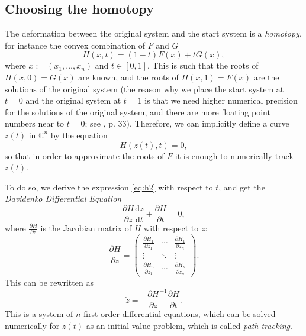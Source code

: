 \documentclass[a4paper]{article}
\newcommand{\C}{\mathbb{C}}
\theoremstyle{definition}
\theoremstyle{definition}
\theoremstyle{remark}
\theoremstyle{definition}
\begin{document}
\subsection{Choosing the homotopy}
The deformation between the original system and the start system is a \textit{homotopy}, for instance the convex combination of $F$ and $G$
\begin{equation}\label{eq:h1} H(x,t)=(1-t)F(x)+tG(x) ,\end{equation}
where $x:=(x_1,\ldots,x_n)$ and $t\in[0,1].$ This is such that the roots of $H(x,0)=G(x)$ are known, and the roots of $H(x,1)=F(x)$ are the solutions of the original system (the
reason why we place the start system at $t=0$ and the original system at $t=1$ is that we need higher numerical precision for the solutions of the original system, and there are more
floating point numbers near to $t=0$; see \cite{BertiniBook}, p. 33).
Therefore, we can implicitly
define a curve $z(t)$ in $\C^n$ by the equation \begin{equation}\label{eq:h2} H(z(t),t)=0,\end{equation} so that in order to approximate the roots of $F$ it is enough to numerically track $z(t)$.

To do so, we derive the expression \eqref{eq:h2} with respect to $t$, and get the \textit{Davidenko Differential Equation}
$$ \frac{\partial H}{\partial z}\frac{\mathrm{d} z}{\mathrm{d} t}+\frac{\partial H}{\partial t}=0 ,$$
where $\frac{\partial H}{\partial z}$ is the Jacobian matrix of $H$ with respect to $z$:
$$
    \frac{\partial H}{\partial z}=
    \begin{pmatrix}
        \frac{\partial H_1}{\partial z_1} & \cdots & \frac{\partial H_1}{\partial z_n} \\
        \vdots                            & \ddots & \vdots                            \\
        \frac{\partial H_n}{\partial z_1} & \cdots & \frac{\partial H_n}{\partial z_n}
    \end{pmatrix} .
$$
This can be rewritten as
\begin{equation}\label{eq:dav} \dot{z}=-\frac{\partial H}{\partial z}^{-1}\frac{\partial H}{\partial t} .\end{equation}
This is a system of $n$ first-order differential equations, which can be solved numerically for $z(t)$ as an initial value problem, which is called \textit{path tracking}.
\end{document}
